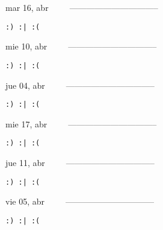 \documentclass[letterpaper,10pt]{article}
\begin{document}
\begin{multicols}{3}
{mar 16, abr\ \ \ \ \ --------------------------------}
\begin{flushright}\begin{small}\texttt{:) :| :(}\end{small}\end{flushright}
\vfill
{mie 10, abr\ \ \ \ \ --------------------------------}
\begin{flushright}\begin{small}\texttt{:) :| :(}\end{small}\end{flushright}\par
\vfill
{jue 04, abr\ \ \ \ \ --------------------------------}
\begin{flushright}\begin{small}\texttt{:) :| :(}\end{small}\end{flushright}\par
\vfill
\end{multicols}
\vspace{1.05cm}

\begin{multicols}{3}
{mie 17, abr\ \ \ \ \ --------------------------------}
\begin{flushright}\begin{small}\texttt{:) :| :(}\end{small}\end{flushright}
\vfill
{jue 11, abr\ \ \ \ \ --------------------------------}
\begin{flushright}\begin{small}\texttt{:) :| :(}\end{small}\end{flushright}\par
\vfill
{vie 05, abr\ \ \ \ \ --------------------------------}
\begin{flushright}\begin{small}\texttt{:) :| :(}\end{small}\end{flushright}\par
\vfill
\end{multicols}
\vspace{1.05cm}
\end{document}
